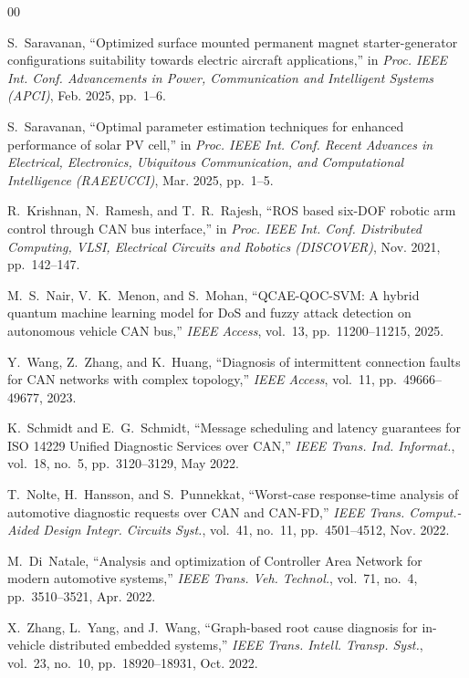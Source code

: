 \documentclass[conference]{IEEEtran}
\begin{document}
\begin{thebibliography}{00}

S.~Saravanan, ``Optimized surface mounted permanent magnet starter-generator configurations suitability towards electric aircraft applications,'' in \emph{Proc. IEEE Int. Conf. Advancements in Power, Communication and Intelligent Systems (APCI)}, Feb. 2025, pp.~1--6.

S.~Saravanan, ``Optimal parameter estimation techniques for enhanced performance of solar PV cell,'' in \emph{Proc. IEEE Int. Conf. Recent Advances in Electrical, Electronics, Ubiquitous Communication, and Computational Intelligence (RAEEUCCI)}, Mar. 2025, pp.~1--5.

R.~Krishnan, N.~Ramesh, and T.~R.~Rajesh, ``ROS based six-DOF robotic arm control through CAN bus interface,'' in \emph{Proc. IEEE Int. Conf. Distributed Computing, VLSI, Electrical Circuits and Robotics (DISCOVER)}, Nov. 2021, pp.~142--147.

M.~S.~Nair, V.~K.~Menon, and S.~Mohan, ``QCAE-QOC-SVM: A hybrid quantum machine learning model for DoS and fuzzy attack detection on autonomous vehicle CAN bus,'' \emph{IEEE Access}, vol.~13, pp.~11200--11215, 2025.

Y.~Wang, Z.~Zhang, and K.~Huang, ``Diagnosis of intermittent connection faults for CAN networks with complex topology,'' \emph{IEEE Access}, vol.~11, pp.~49666--49677, 2023.

K.~Schmidt and E.~G.~Schmidt, ``Message scheduling and latency guarantees for ISO 14229 Unified Diagnostic Services over CAN,'' \emph{IEEE Trans. Ind. Informat.}, vol.~18, no.~5, pp.~3120--3129, May 2022.

T.~Nolte, H.~Hansson, and S.~Punnekkat, ``Worst-case response-time analysis of automotive diagnostic requests over CAN and CAN-FD,'' \emph{IEEE Trans. Comput.-Aided Design Integr. Circuits Syst.}, vol.~41, no.~11, pp.~4501--4512, Nov. 2022.

M.~Di~Natale, ``Analysis and optimization of Controller Area Network for modern automotive systems,'' \emph{IEEE Trans. Veh. Technol.}, vol.~71, no.~4, pp.~3510--3521, Apr. 2022.

X.~Zhang, L.~Yang, and J.~Wang, ``Graph-based root cause diagnosis for in-vehicle distributed embedded systems,'' \emph{IEEE Trans. Intell. Transp. Syst.}, vol.~23, no.~10, pp.~18920--18931, Oct. 2022.


\end{thebibliography}
\end{document}
